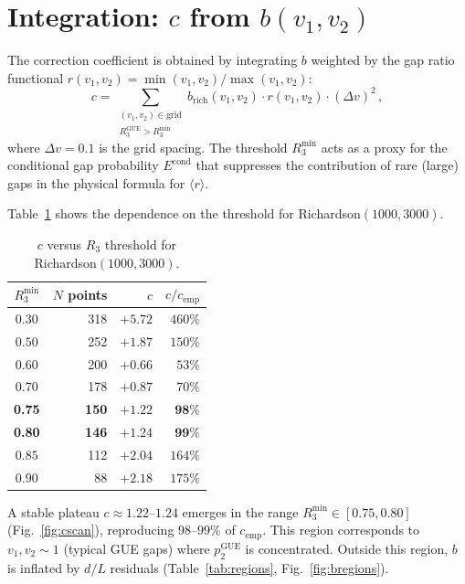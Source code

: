 \documentclass[11pt]{article}
\begin{document}
\section{Integration: $c$ from $b(v_1, v_2)$}
\label{sec:integration}

The correction coefficient is obtained by integrating $b$ weighted by the
gap ratio functional $r(v_1, v_2) = \min(v_1,v_2)/\max(v_1,v_2)$:
\begin{equation}
c = \sum_{\substack{(v_1, v_2) \in \mathrm{grid} \\ R_3^{\mathrm{GUE}} > R_3^{\min}}}
b_{\mathrm{rich}}(v_1, v_2) \cdot r(v_1, v_2) \cdot (\Delta v)^2\,,
\label{eq:c_integral}
\end{equation}
where $\Delta v = 0.1$ is the grid spacing. The threshold $R_3^{\min}$
acts as a proxy for the conditional gap probability $E^{\mathrm{cond}}$
that suppresses the contribution of rare (large) gaps in the physical
formula for $\langle r \rangle$.

Table~\ref{tab:scan} shows the dependence on the threshold for
Richardson$(1000, 3000)$.

\begin{table}[ht]
\centering
\caption{$c$ versus $R_3$ threshold for Richardson$(1000, 3000)$.}
\label{tab:scan}
\begin{tabular}{crrr}
\toprule
$R_3^{\min}$ & $N$ points & $c$ & $c/c_{\mathrm{emp}}$ \\
\midrule
$0.30$ & 318 & $+5.72$ & $460\%$ \\
$0.50$ & 252 & $+1.87$ & $150\%$ \\
$0.60$ & 200 & $+0.66$ & $53\%$ \\
$0.70$ & 178 & $+0.87$ & $70\%$ \\
\textbf{0.75} & \textbf{150} & $\mathbf{+1.22}$ & $\mathbf{98\%}$ \\
\textbf{0.80} & \textbf{146} & $\mathbf{+1.24}$ & $\mathbf{99\%}$ \\
$0.85$ & 112 & $+2.04$ & $164\%$ \\
$0.90$ & 88 & $+2.18$ & $175\%$ \\
\bottomrule
\end{tabular}
\end{table}

A stable plateau $c \approx 1.22$--$1.24$ emerges in the range
$R_3^{\min} \in [0.75, 0.80]$ (Fig.~\ref{fig:cscan}), reproducing
$98$--$99\%$ of $c_{\mathrm{emp}}$.
This region corresponds to $v_1, v_2 \sim 1$ (typical GUE gaps) where
$p_2^{\mathrm{GUE}}$ is concentrated. Outside this region, $b$ is inflated
by $d/L$ residuals (Table~\ref{tab:regions}, Fig.~\ref{fig:bregions}).
\end{document}
